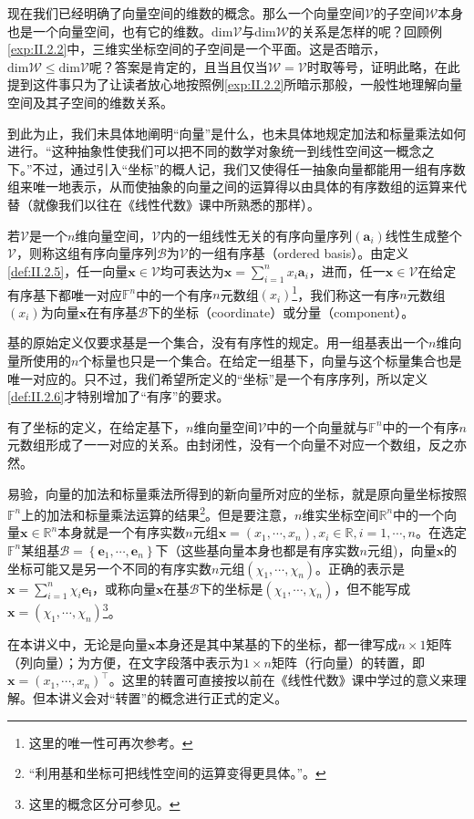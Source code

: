 \documentclass[main.tex]{subfiles}
\begin{document}
现在我们已经明确了向量空间的维数的概念。那么一个向量空间$\mathcal{V}$的子空间$\mathcal{W}$本身也是一个向量空间，也有它的维数。$\mathrm{dim}\mathcal{V}$与$\mathrm{dim}\mathcal{W}$的关系是怎样的呢？回顾例\ref{exp:II.2.2}中，三维实坐标空间的子空间是一个平面。这是否暗示，$\mathrm{dim}\mathcal{W}\leq\mathrm{dim}\mathcal{V}$呢？答案是肯定的，且当且仅当$\mathcal{W}=\mathcal{V}$时取等号，证明此略，在此提到这件事只为了让读者放心地按照例\ref{exp:II.2.2}所暗示那般，一般性地理解向量空间及其子空间的维数关系。

到此为止，我们未具体地阐明“向量”是什么，也未具体地规定加法和标量乘法如何进行。“这种抽象性使我们可以把不同的数学对象统一到线性空间这一概念之下。”\cite[p.~167]{周胜林2012线性代数}不过，通过引入“坐标”的概人记，我们又使得任一抽象向量都能用一组有序数组来唯一地表示，从而使抽象的向量之间的运算得以由具体的有序数组的运算来代替（就像我们以往在《线性代数》课中所熟悉的那样）。

\begin{definition}[向量在给定有序基下的坐标]\label{def:II.2.6}若$\mathcal{V}$是一个$n$维向量空间，$\mathcal{V}$内的一组线性无关的有序向量序列$\left(\mathbf{a}_i\right)$线性生成整个$\mathcal{V}$，则称这组有序向量序列$\mathcal{B}$为$\mathcal{V}$的一组有序基（ordered basis）。由定义\ref{def:II.2.5}，任一向量$\mathbf{x}\in\mathcal{V}$均可表达为$\mathbf{x}=\sum_{i=1}^nx_i\mathbf{a}_i$，进而，任一$\mathbf{x}\in\mathcal{V}$在给定有序基下都唯一对应$\mathbb{F}^n$中的一个有序$n$元数组$\left(x_i\right)$\footnote{这里的唯一性可再次参考\cite[“(3)的证明”，p.~171]{周胜林2012线性代数}。}，我们称这一有序$n$元数组$\left(x_i\right)$为向量$\mathbf{x}$在有序基$\mathcal{B}$下的坐标（coordinate）或分量（component）。
\end{definition}

基的原始定义仅要求基是一个集合，没有有序性的规定。用一组基表出一个$n$维向量所使用的$n$个标量也只是一个集合。在给定一组基下，向量与这个标量集合也是唯一对应的。只不过，我们希望所定义的“坐标”是一个有序序列，所以定义\ref{def:II.2.6}才特别增加了“有序”的要求。

有了坐标的定义，在给定基下，$n$维向量空间$\mathcal{V}$中的一个向量就与$\mathbb{F}^n$中的一个有序$n$元数组形成了一一对应的关系。由封闭性，没有一个向量不对应一个数组，反之亦然。

易验，向量的加法和标量乘法所得到的新向量所对应的坐标，就是原向量坐标按照$\mathbb{F}^n$上的加法和标量乘法运算的结果\footnote{“利用基和坐标可把线性空间的运算变得更具体。”\cite[p.173]{周胜林2012线性代数}。}。但是要注意，$n$维实坐标空间$\mathbb{R}^n$中的一个向量$\mathbf{x}\in\mathbb{R}^n$本身就是一个有序实数$n$元组$\mathbf{x}=\left(x_1,\cdots,x_n\right),x_i\in\mathbb{R},i=1,\cdots,n$。在选定$\mathbb{F}^n$某组基$\mathcal{B}=\left\{\mathbf{e}_1,\cdots,\mathbf{e}_n\right\}$下（这些基向量本身也都是有序实数$n$元组)，向量$\mathbf{x}$的坐标可能又是另一个不同的有序实数$n$元组$\left(\chi_1,\cdots,\chi_n\right)$。正确的表示是$\mathbf{x}=\sum_{i=1}^{n}\chi_i\mathbf{e_i}$，或称向量$\mathbf{x}$在基$\mathcal{B}$下的坐标是$\left(\chi_1,\cdots,\chi_n\right)$，但不能写成$\mathbf{x}=\left(\chi_1,\cdots,\chi_n\right)$\footnote{这里的概念区分可参见\cite[例题2.1,p.~173]{周胜林2012线性代数}。}。

在本讲义中，无论是向量$\mathbf{x}$本身还是其中某基的下的坐标，都一律写成$n\times 1$矩阵（列向量）；为方便，在文字段落中表示为$1\times n$矩阵（行向量）的转置，即$\mathbf{x}=\left(x_1,\cdots,x_n\right)^\intercal$。这里的转置可直接按以前在《线性代数》课中学过的意义来理解。但本讲义会对“转置”的概念进行正式的定义。
\end{document}
